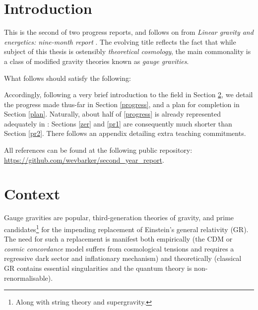 \documentclass[twoside]{report}
\begin{document}
\appedndixtitleon
\appedndixtitletocon



\begin{multicols}{2}
\section{Introduction}
This is the second of two progress reports, and follows on from \textit{Linear gravity and energetics: nine-month report} \cite{lg}. The evolving title reflects the fact that while subject of this thesis is ostensibly \textit{theoretical cosmology}, the main commonality is a class of modified gravity theories known as \textit{gauge gravities}.

What follows should satisfy the following:

\noindent{}

Accordingly, following a very brief introduction to the field in Section \ref{context}, we detail the progress made thus-far in Section \ref{progress}, and a plan for completion in Section \ref{plan}. Naturally, about half of \ref{progress} is already represented adequately in \cite{lg}: Sections \ref{zer} and \ref{pr1} are consequently much shorter than Section \ref{pr2}. There follows an appendix detailing extra teaching commitments.

All references can be found at the following public repository: \url{https://github.com/wevbarker/second_year_report}.
\section{Context}\label{context}
Gauge gravities are popular, third-generation theories of gravity, and prime candidates\footnote{Along with string theory and supergravity.} for the impending replacement of Einstein's general relativity (GR). The need for such a replacement is manifest both empirically (the \textLambda CDM or \textit{cosmic concordance} model suffers from cosmological tensions and requires a regressive dark sector and inflationary mechanism) and theoretically (classical GR contains essential singularities and the quantum theory is non-renormalisable).


\end{multicols}
\end{document}
